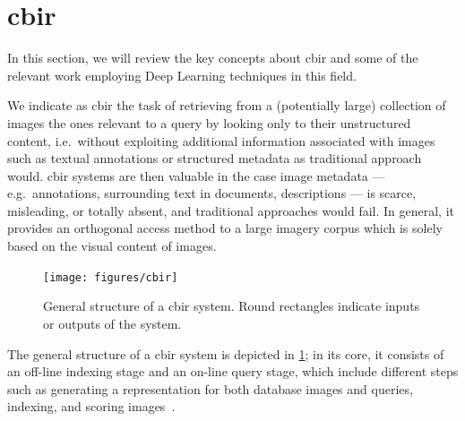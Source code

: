 


\section{\acrlong{cbir}}
\label{sec:back:image-retrieval}
In this section, we will review the key concepts about \acrlong{cbir} and some of the relevant work employing Deep Learning techniques in this field.

We indicate as \acrfull{cbir} the task of retrieving from a (potentially large) collection of images the ones relevant to a query by looking only to their unstructured content, i.e.\ without exploiting additional information associated with images such as textual annotations or structured metadata as traditional approach would.
\gls{cbir} systems are then valuable in the case image metadata --- e.g.\ annotations, surrounding text in documents, descriptions --- is scarce, misleading, or totally absent, and traditional approaches would fail.
In general, it provides an orthogonal access method to a large imagery corpus which is solely based on the visual content of images.

\begin{figure}
    \texttt{[image: figures/cbir]}
    \caption{General structure of a \acrfull{cbir} system. Round rectangles indicate inputs or outputs of the system.}
    \label{fig:back:cbir}
\end{figure}
The general structure of a \gls{cbir} system is depicted in \ref{fig:back:cbir};
in its core, it consists of an off-line indexing stage and an on-line query stage, which include different steps such as generating a representation for both database images and queries, indexing, and scoring images~\cite{zhou2017recent}.

